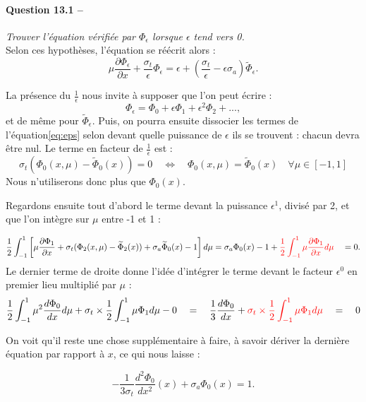 \documentclass[11pt,a4paper]{article}
\newcommand{\dx}[1]{\dfrac{\partial #1}{\partial x}}
\newcommand{\question}[2]{\paragraph{Question #1 --}\hspace{-7pt}\textit{#2} \\}
\newcommand{\Phit}{\widetilde{\Phi}}
\begin{document}
\question{13.1}{Trouver l'équation vérifiée par $\Phi_\epsilon$ lorsque $\epsilon$ tend vers 0.}

Selon ces hypothèses, l'équation se réécrit alors :
\begin{equation}
 \mu \frac{\partial \Phi_\epsilon}{\partial x} + \frac{\sigma_t}{\epsilon} \Phi_\epsilon =  \epsilon + \left(\frac{\sigma_t}{\epsilon} - \epsilon \sigma_a\right) \Phit_\epsilon .
 \label{eq:eps}
\end{equation}

La présence du $\frac{1}{\epsilon}$ nous invite à supposer que l'on peut écrire :
\begin{equation}
 \Phi_\epsilon = \Phi_0 + \epsilon\Phi_1 + \epsilon^2 \Phi_2 + ... ,
\end{equation}
et de même pour $\Phit_\epsilon$.
Puis, on pourra ensuite dissocier les termes de l'équation\ref{eq:eps} selon devant quelle puissance de $\epsilon$ ils se trouvent : chacun devra être nul.
Le terme en facteur de $\frac{1}{\epsilon}$ est :
\begin{equation}
 \sigma_t (\Phi_0(x,\mu) - \Phit_0(x)) = 0 \quad \Leftrightarrow \quad \Phi_0(x,\mu) = \Phit_0(x) \quad \forall \mu \in [-1,1]
\end{equation}
Nous n'utiliserons donc plus que $\Phi_0(x)$.

Regardons ensuite tout d'abord le terme devant la puissance $\epsilon^1$, divisé par 2, et que l'on intègre sur $\mu$ entre -1 et 1 :

\begin{equation}
 \frac{1}{2}\int_{-1}^1 \left[ \mu \dx{\Phi_1} + \sigma_t (\Phi_2(x,\mu) - \Phit_2(x)) + \sigma_a \Phit_0(x) -1 \right] d\mu
 = \sigma_a \Phi_0(x) -1 + \textcolor{red}{\frac{1}{2}\int_{-1}^1  \mu \dx{\Phi_1} d\mu} \quad = 0.
\end{equation}
Le dernier terme de droite donne l'idée d'intégrer le terme devant le facteur $\epsilon^0$ en premier lieu multiplié par $\mu$ :
\begin{equation}
 \frac{1}{2} \int_{-1}^1 \mu^2 \frac{d\Phi_0}{dx} d\mu + \sigma_t \times \frac{1}{2}\int_{-1}^1  \mu \Phi_1 d\mu - 0
 \quad = \quad \frac{1}{3} \frac{d\Phi_0}{dx} + \textcolor{red}{\sigma_t \times \frac{1}{2}\int_{-1}^1  \mu \Phi_1 d\mu}
 \quad = \quad 0
\end{equation}

On voit qu'il reste une chose supplémentaire à faire, à savoir dériver la dernière équation par rapport à $x$, ce qui nous laisse :

\begin{equation}
- \frac{1}{3 \sigma_t} \frac{d^2 \Phi_0}{d x^2}(x) + \sigma_a\Phi_0(x) = 1 .
\end{equation}
\end{document}
